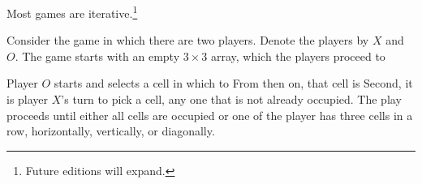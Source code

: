 

Most games are iterative.\footnote{Future editions will expand.}


Consider the game  in which there are two players.
Denote the players by $X$ and $O$.
The game starts with an empty $3 \times 3$ array, which the players proceed to 

Player $O$ starts and selects a cell in which to 
From then on, that cell is 
Second, it is player $X$'s turn to pick a cell, any one that is not already occupied.
The play proceeds until either all cells are occupied or one of the player has three cells in a row, horizontally, vertically, or diagonally.


\blankpage
